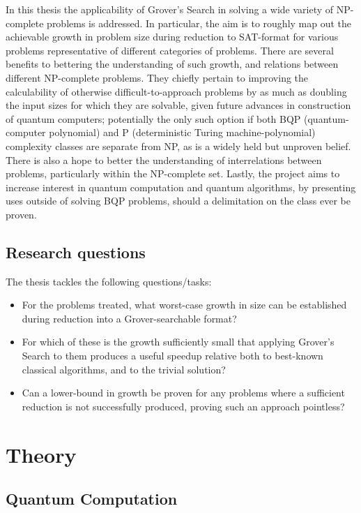 \documentclass[msc,lith,english]{liuthesis}
\begin{document}
In this thesis the applicability of Grover's Search in solving a wide variety of NP-complete problems is addressed. In particular, the aim is to roughly map out the achievable growth in problem size during reduction to SAT-format for various problems representative of different categories of problems. There are several benefits to bettering the understanding of such growth, and relations between different NP-complete problems. They chiefly pertain to improving the calculability of otherwise difficult-to-approach problems by as much as doubling the input sizes for which they are solvable, given future advances in construction of quantum computers; potentially the only such option if both BQP (quantum-computer polynomial) and P (deterministic Turing machine-polynomial) complexity classes are separate from NP, as is a widely held but unproven belief. There is also a hope to better the understanding of interrelations between problems, particularly within the NP-complete set. Lastly, the project aims to increase interest in quantum computation and quantum algorithms, by presenting uses outside of solving BQP problems, should a delimitation on the class ever be proven.

\section{Research questions}
The thesis tackles the following questions/tasks:
\begin{itemize}
    \item For the problems treated, what worst-case growth in size can be established during reduction into a Grover-searchable format?
    \item For which of these is the growth sufficiently small that applying Grover's Search to them produces a useful speedup relative both to best-known classical algorithms, and to the trivial solution?
    \item Can a lower-bound in growth be proven for any problems where a sufficient reduction is not successfully produced, proving such an approach pointless?
\end{itemize}

\chapter{Theory}

\section{Quantum Computation}
\end{document}
